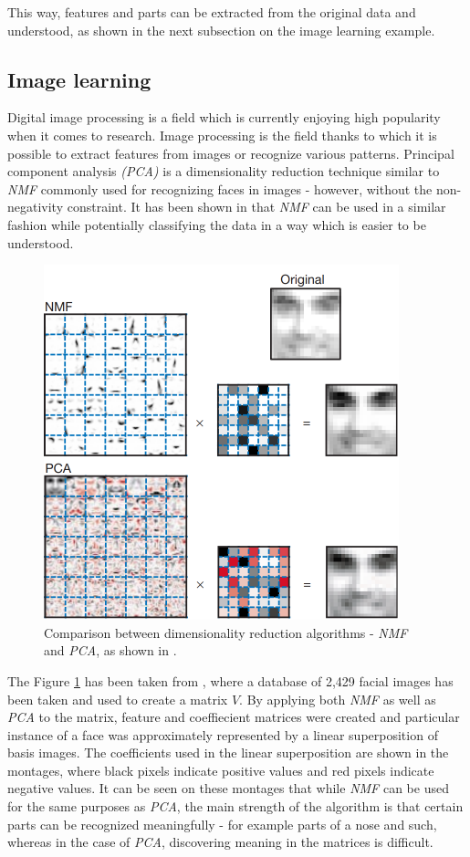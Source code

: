 \documentclass[thesis=M,english]{FITthesis}[2012/10/20]
\begin{document}
This way, features and parts can be extracted from
the original data and understood, as shown in the next subsection on the
image learning example.

\subsection{Image learning}
Digital image processing is a field which is currently enjoying high
popularity when it comes to research. Image processing is the field thanks
to which it is possible to extract features from images or recognize
various patterns. Principal component analysis \emph{(PCA)} is a dimensionality
reduction technique similar to \emph{NMF} commonly used for recognizing
faces in images \cite{pca-facial} - however, without the non-negativity constraint.
It has been shown in \cite{lee99} that \emph{NMF} can be used in a similar
fashion while potentially classifying the data in a way which is easier to be understood.
\\

\begin{figure}[h]
  \centering
  \includegraphics{nmfpca-comparison}
  \caption{Comparison between dimensionality reduction algorithms - \emph{NMF} and \emph{PCA},
           as shown in \cite{lee99}.}
  \label{fig:nmfpca-comparison}
\end{figure}

The Figure \ref{fig:nmfpca-comparison} has been taken from \cite{lee99}, where a database of
2,429 facial images has been taken and used to create a matrix $V$. By
applying both \emph{NMF} as well as \emph{PCA} to the matrix, feature
and coeffiecient matrices were created and particular instance of a
face was approximately represented by a linear superposition of basis
images. The coefficients used in the linear superposition are shown in the
montages, where black pixels indicate positive values and red pixels indicate
negative values. It can be seen on these montages that while \emph{NMF}
can be used for the same purposes as \emph{PCA}, the main strength of the
algorithm is that certain parts can be recognized meaningfully - for example
parts of a nose and such, whereas in the case of \emph{PCA}, discovering
meaning in the matrices is difficult.
\\
\end{document}
